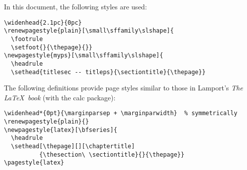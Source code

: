 \documentclass[a4paper]{ltxguide}
\begin{document}
In this document, the following styles are used:
\begin{verbatim}
\widenhead{2.1pc}{0pc}
\renewpagestyle{plain}[\small\sffamily\slshape]{
  \footrule 
  \setfoot{}{\thepage}{}}
\newpagestyle{myps}[\small\sffamily\slshape]{
  \headrule
  \sethead{titlesec -- titleps}{\sectiontitle}{\thepage}}
\end{verbatim}

The following definitions provide page styles similar to those in
Lamport's \textit{The \LaTeX\ book} (with the \textsf{calc} package):
\begin{verbatim}
\widenhead*{0pt}{\marginparsep + \marginparwidth}  % symmetrically
\renewpagestyle{plain}{}
\newpagestyle{latex}[\bfseries]{
  \headrule
  \sethead[\thepage][][\chaptertitle]
          {\thesection\ \sectiontitle}{}{\thepage}}
\pagestyle{latex}
\end{verbatim}

% 

% 
% 
% 
\end{document}

